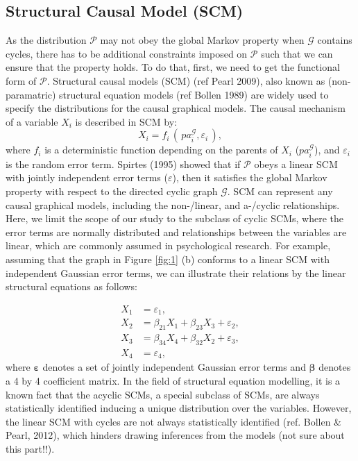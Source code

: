 \documentclass[11pt]{article}
\theoremstyle{definition}
\begin{document}
\subsection{Structural Causal Model (SCM)} \label{scm}
As the distribution $\mathcal{P}$ may not obey the global Markov property when $\mathcal{G}$ contains cycles, there has to be additional constraints imposed on $\mathcal{P}$ such that we can ensure that the property holds. To do that, first, we need to get the functional form of $\mathcal{P}$. Structural causal models (SCM) (ref Pearl 2009), also known as (non-paramatric) structural equation models (ref Bollen 1989) are widely used to specify the distributions for the causal graphical models. The causal mechanism of a variable $X_i$ is described in SCM by:
$$X_i = f_i\,(\,pa_{i}^{\mathcal{G}}, \varepsilon_i\,),$$
where $f_i$ is a deterministic function depending on the parents of $X_i$ ($pa_{i}^{\mathcal{G}}$), and $\varepsilon_i$ is the random error term.
Spirtes (1995) showed that if $\mathcal{P}$ obeys a linear SCM with jointly independent error terms ($\varepsilon$), then it satisfies the global Markov property with respect to the directed cyclic graph $\mathcal{G}$. 
SCM can represent any causal graphical models, including the non-/linear, and a-/cyclic relationships. Here, we limit the scope of our study to the subclass of cyclic SCMs, where the error terms are normally distributed and relationships between the variables are linear, which are commonly assumed in psychological research. For example, assuming that the graph in Figure \ref{fig:1} (b) conforms to a linear SCM with independent Gaussian error terms, we can illustrate their relations by the linear structural equations as follows:

\begin{equation} \label{eq:1}
  \begin{aligned}
X_1 &= \varepsilon_1,\\
X_2 &= \beta_{21}X_1 + \beta_{23}X_3 + \varepsilon_2,\\
X_3 &= \beta_{34}X_4 + \beta_{32}X_2 + \varepsilon_3,\\
X_4 &= \varepsilon_4,
  \end{aligned}
\end{equation}
where $\boldsymbol{\varepsilon}$ denotes a set of jointly independent Gaussian error terms and $\boldsymbol{\beta}$ denotes a 4 by 4 coefficient matrix.
In the field of structural equation modelling, it is a known fact that the acyclic SCMs, a special subclass of SCMs, are always statistically identified inducing a unique distribution over the variables. However, the linear SCM with cycles are not always statistically identified (ref. Bollen \& Pearl, 2012), which hinders drawing inferences from the models (not sure about this part!!). 
\end{document}

